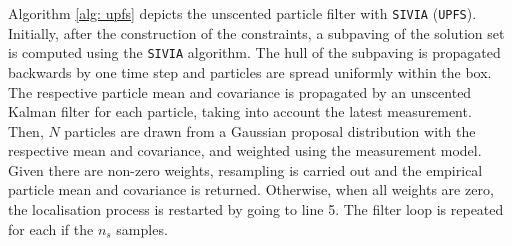 Algorithm \ref{alg: upfs} depicts the unscented particle filter with \texttt{SIVIA} (\texttt{UPFS}). Initially, after the construction of the constraints, a subpaving of the solution set is computed using the \texttt{SIVIA} algorithm. The hull of the subpaving is propagated backwards by one time step and particles are spread uniformly within the box. The respective particle mean and covariance is propagated by an unscented Kalman filter for each particle, taking into account the latest measurement. Then, $N$ particles are drawn from a Gaussian proposal distribution with the respective mean and covariance, and weighted using the measurement model. Given there are non-zero weights, resampling is carried out and the empirical particle mean and covariance is returned. Otherwise, when all weights are zero, the localisation process is restarted by going to line 5. The filter loop is repeated for each if the $n_s$ samples.



 



%
%
%
%
%
%

% 
%
%
